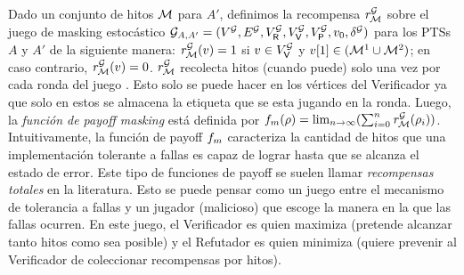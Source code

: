 Dado un conjunto de hitos $\milestones$ para $A'$, definimos la recompensa
$\mreward^\StochG$ sobre el juego de masking estocástico
$\StochG_{A,A'} = (V^\StochG, E^\StochG, V^\StochG_\Refuter, V^\StochG_\Verifier, V^\StochG_\Probabilistic, \InitVertex, \delta^\StochG)$ para los PTSs $A$ y $A'$ de la siguiente manera:
%
$\mreward^\StochG(v) = 1$ si $v\in V^\StochG_\Verifier$ y
$\pr{1}{v}\in(\milestones^1\cup\milestones^2)$; en caso contrario,
$\mreward^\StochG(v) = 0$.
%
$\mreward^\StochG$ recolecta hitos (cuando puede) solo una vez por cada ronda del juego
. Esto solo se puede hacer en los vértices del Verificador ya que solo en estos se almacena la etiqueta que se esta jugando en la ronda.
%
Luego, la \emph{función de payoff masking} está definida por
%
$\FMask(\rho) = \lim_{n \rightarrow \infty} (\sum^{n}_{i=0} \mreward^\StochG(\rho_i))$.
%
Intuitivamente, la función de payoff $\FMask$ caracteriza la cantidad de hitos que una implementación tolerante a fallas es capaz de lograr hasta que se alcanza el estado de error. Este tipo de funciones de payoff se suelen llamar \emph{recompensas totales} en la literatura.
Esto se puede pensar como un juego entre el mecanismo de tolerancia a fallas y un jugador (malicioso) que escoge la manera en la que las fallas ocurren. En este juego, el Verificador es quien maximiza (pretende alcanzar tanto hitos como sea posible) y el Refutador es quien minimiza (quiere prevenir al Verificador de coleccionar recompensas por hitos).  

    

